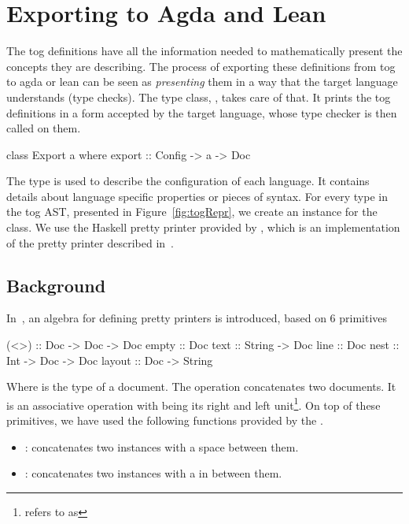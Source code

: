 \section{Exporting to Agda and Lean}
\label{sec:exporting_agda}
The tog definitions have all the information needed to mathematically present the concepts they are describing. The process of exporting these definitions from tog to agda or lean can be seen as \emph{presenting} them in a way that the target language understands (type checks). The type class, , takes care of that. It prints the tog definitions in a form accepted by the target language, whose type checker is then called on them. 
\begin{hscode}
class Export a where
  export :: Config -> a -> Doc  
\end{hscode}
The  type is used to describe the configuration of each language. It contains details about language specific properties or pieces of syntax. 
For every type in the tog AST, presented in Figure~\ref{fig:togRepr}, we create an instance for the  class.
We use the Haskell pretty printer provided by , which is an implementation of the pretty printer described in~\cite{wadler2003prettier}. 

\subsection{Background}
In~\cite{wadler2003prettier}, an algebra for defining pretty printers is introduced, based on $6$ primitives 
\begin{hscode}
(<>) :: Doc -> Doc -> Doc 
empty  :: Doc 
text :: String -> Doc 
line :: Doc 
nest :: Int -> Doc -> Doc 
layout :: Doc -> String 
\end{hscode}
Where  is the type of a document. The \lstmath{(<>)} operation concatenates two documents. It is an associative operation with  being its right and left unit\footnote{\cite{wadler2003prettier} refers to  as }. 
On top of these primitives, we have used the following functions provided by the 
. 
\begin{itemize}
\item \lstmath{(<+>)} : concatenates two  instances with a space between them. 
\item \lstmath{(<$\$\$$>)} : concatenates two  instances with a  in between them. 
\end{itemize}

